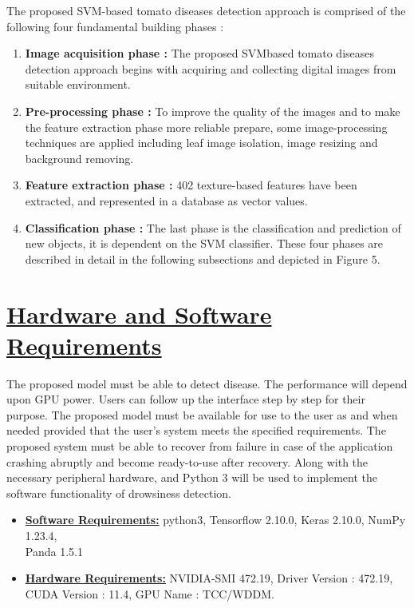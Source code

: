 \documentclass[12pt,a4paper, oneside]{article}
\begin{document}
\begin{enumerate}
The proposed SVM-based tomato diseases detection approach is comprised of the following four fundamental building phases : 
\begin{enumerate}
    \item \textbf{Image acquisition phase :}  The proposed SVMbased tomato diseases detection approach begins with acquiring and collecting digital images from suitable environment.
    \item \textbf{Pre-processing phase :}  To improve the quality of the images and to make the feature extraction phase more reliable prepare, some image-processing techniques are applied including leaf image isolation, image resizing and background removing.
    \item \textbf{Feature extraction phase : } 402 texture-based features have been extracted, and represented in a database as vector values.
    \pagebreak
    \item  \textbf{Classification phase : }   The last phase is the classification and prediction of new objects, it is dependent on the SVM classifier. These four phases are described in detail in the following subsections and depicted in Figure 5.
\end{enumerate}

\newpage

\section{\underline{Hardware and Software Requirements}}
The proposed model must be able to detect disease. The performance will depend upon GPU power. Users can follow up the interface step by step for their purpose. The proposed model must be available for use to the user as and when needed provided that the user’s system meets the specified requirements. The proposed system must be able to recover from failure in case of the application crashing abruptly and become ready-to-use after recovery. Along with the necessary peripheral hardware, and Python 3 will be used to implement the software functionality of drowsiness detection.\\
\begin{itemize}
    \item \textbf{\underline{Software Requirements:}}
python3, Tensorflow 2.10.0, Keras 2.10.0, NumPy 1.23.4, \\
Panda 1.5.1
\item \textbf{\underline{Hardware Requirements:}}
NVIDIA-SMI 472.19, Driver Version : 472.19, CUDA Version : 11.4,    GPU Name : TCC/WDDM.
\end{itemize}




\end{enumerate}
\end{document}
